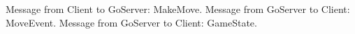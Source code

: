 Message from Client to GoServer: MakeMove. Message from GoServer to Client: MoveEvent. Message from GoServer to Client: GameState.
